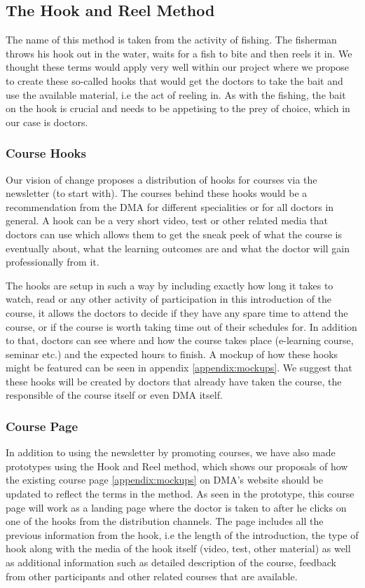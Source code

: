 \subsection{The Hook and Reel Method}
The name of this method is taken from the activity of fishing. The fisherman throws his hook out in the water, waits for a fish to bite and then reels it in. We thought these terms would apply very well within our project where we propose to create these so-called hooks that would get the doctors to take the bait and use the available material, i.e the act of reeling in. As with the fishing, the bait on the hook is crucial and needs to be appetising to the prey of choice, which in our case is doctors.

\subsubsection{Course Hooks}
Our vision of change proposes a distribution of hooks for courses via the newsletter (to start with). The courses behind these hooks would be a recommendation from the DMA for different specialities or for all doctors in general. A hook can be a very short video, test or other related media that doctors can use which allows them to get the sneak peek of what the course is eventually about, what the learning outcomes are and what the doctor will gain professionally from it.

The hooks are setup in such a way by including exactly how long it takes to watch, read or any other activity of participation in this introduction of the course, it allows the doctors to decide if they have any spare time to attend the course, or if the course is worth taking time out of their schedules for. In addition to that, doctors can see where and how the course takes place (e-learning course, seminar etc.) and the expected hours to finish. A mockup of how these hooks might be featured can be seen in appendix \ref{appendix:mockups}. We suggest that these hooks will be created by doctors that already have taken the course, the responsible of the course itself or even DMA itself.

\subsubsection{Course Page}
In addition to using the newsletter by promoting courses, we have also made prototypes using the Hook and Reel method, which shows our proposals of how the existing course page \ref{appendix:mockups} on DMA’s website should be updated to reflect the terms in the method. As seen in the prototype, this course page will work as a landing page where the doctor is taken to after he clicks on one of the hooks from the distribution channels. The page includes all the previous information from the hook, i.e the length of the introduction, the type of hook along with the media of the hook itself (video, test, other material) as well as additional information such as detailed description of the course, feedback from other participants and other related courses that are available.



